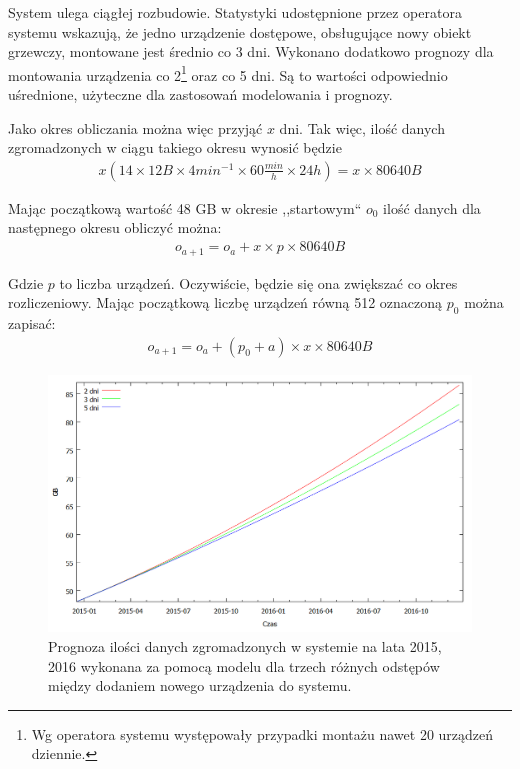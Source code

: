 \documentclass[a4paper,polish,12pt,twoside]{article}
\begin{document}
System ulega ciągłej rozbudowie. Statystyki udostępnione przez operatora systemu wskazują, że jedno urządzenie dostępowe, obsługujące nowy obiekt grzewczy, montowane jest średnio co 3 dni. Wykonano dodatkowo prognozy dla montowania urządzenia co 2\footnote{Wg operatora systemu występowały przypadki montażu nawet 20 urządzeń dziennie.} oraz co 5 dni. Są to wartości odpowiednio uśrednione, użyteczne dla zastosowań modelowania i prognozy.

Jako okres obliczania można więc przyjąć $x$ dni. Tak więc, ilość danych zgromadzonych w ciągu takiego okresu wynosić będzie 
\begin{align*}
	x(14 \times 12B \times 4 min^{-1} \times 60 \frac{min}{h} \times 24 h) = x \times 80640 B
\end{align*}

Mając początkową wartość 48 GB w okresie ,,startowym`` $o_{0}$ ilość danych dla następnego okresu obliczyć można:
\begin{align*}
	o_{a+1} = o_a + x \times p \times 80640 B
\end{align*}

Gdzie $p$ to liczba urządzeń. Oczywiście, będzie się ona zwiększać co okres rozliczeniowy. Mając początkową liczbę urządzeń równą 512 oznaczoną $p_{0}$ można zapisać:
\begin{align*}
	o_{a+1} = o_a + (p_{0} + a) \times x \times 80640 B
\end{align*}

	\begin{figure}[h]
		\centering \includegraphics[width=15cm]{smok_prognosis}
		\caption[Prognoza ilości danych zgromadzonych w systemie na lata 2015, 2016]{Prognoza ilości danych zgromadzonych w systemie na lata 2015, 2016 wykonana za pomocą modelu dla trzech różnych odstępów między dodaniem nowego urządzenia do systemu.}
		\label{fig:smok_prognosis}
	\end{figure}
\end{document}
